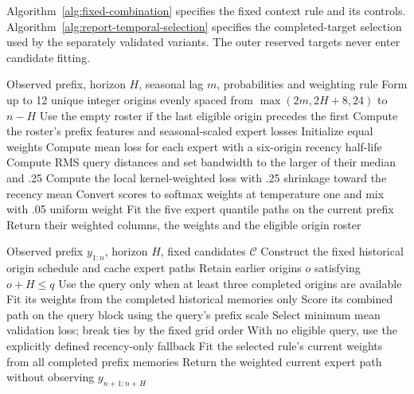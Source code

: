 Algorithm~\ref{alg:fixed-combination} specifies the fixed context rule
and its controls. Algorithm~\ref{alg:report-temporal-selection} specifies
the completed-target selection used by the separately validated variants.
The outer reserved targets never enter candidate fitting.

\begin{algorithm}[htbp]
\caption{Combine five current expert forecasts using fixed contextual, recency-only or uniform weights estimated from completed origins.}
\label{alg:fixed-combination}
\begin{algorithmic}[1]
\Require Observed prefix, horizon $H$, seasonal lag $m$, probabilities and weighting rule
\State Form up to 12 unique integer origins evenly spaced from $\max(2m,2H+8,24)$ to $n-H$
\State Use the empty roster if the last eligible origin precedes the first
\State Compute the roster's prefix features and seasonal-scaled expert losses
\State Initialize equal weights
  \State Compute mean loss for each expert with a six-origin recency half-life
    \State Compute RMS query distances and set bandwidth to the larger of their median and .25
    \State Compute the local kernel-weighted loss with .25 shrinkage toward the recency mean
  \EndIf
  \State Convert scores to softmax weights at temperature one and mix with .05 uniform weight
\EndIf
\State Fit the five expert quantile paths on the current prefix
\State Return their weighted columns, the weights and the eligible origin roster
\end{algorithmic}
\end{algorithm}

\begin{algorithm}[htbp]
\caption{Temporally completed candidate selection. Every expert forecast and
validation target used to choose a combination is available before the current
reserved target block begins.}
\label{alg:report-temporal-selection}
\begin{algorithmic}[1]
\Require Observed prefix $y_{1:n}$, horizon $H$, fixed candidates $\mathcal C$
\State Construct the fixed historical origin schedule and cache expert paths
\State Retain earlier origins $o$ satisfying $o+H\leq q$
\State Use the query only when at least three completed origins are available
\State Fit its weights from the completed historical memories only
\State Score its combined path on the query block using the query's prefix scale
\EndFor
\EndFor
\State Select minimum mean validation loss; break ties by the fixed grid order
\State With no eligible query, use the explicitly defined recency-only fallback
\State Fit the selected rule's current weights from all completed prefix memories
\State Return the weighted current expert path without observing $y_{n+1:n+H}$
\end{algorithmic}
\end{algorithm}
